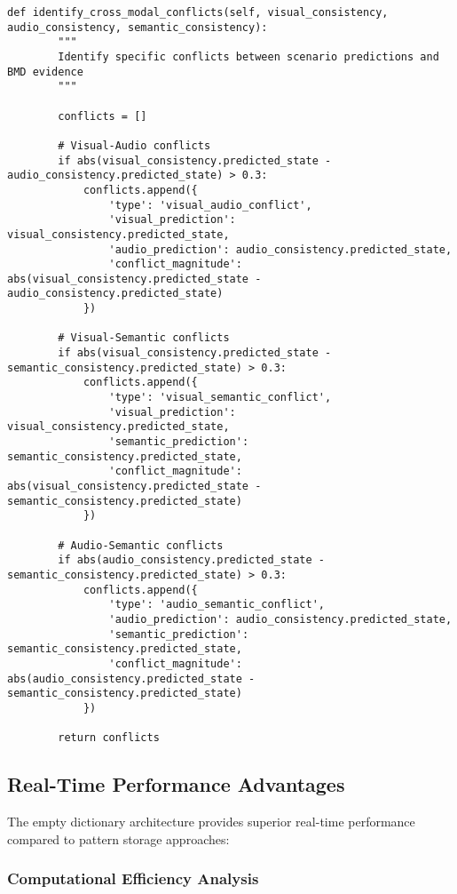 \documentclass[12pt,a4paper]{article}
\begin{document}
\begin{lstlisting}[style=pythonstyle, caption=Cross-Modal Scenario Consistency Validation]
    def identify_cross_modal_conflicts(self, visual_consistency, audio_consistency, semantic_consistency):
        """
        Identify specific conflicts between scenario predictions and BMD evidence
        """
        
        conflicts = []
        
        # Visual-Audio conflicts
        if abs(visual_consistency.predicted_state - audio_consistency.predicted_state) > 0.3:
            conflicts.append({
                'type': 'visual_audio_conflict',
                'visual_prediction': visual_consistency.predicted_state,
                'audio_prediction': audio_consistency.predicted_state,
                'conflict_magnitude': abs(visual_consistency.predicted_state - audio_consistency.predicted_state)
            })
        
        # Visual-Semantic conflicts
        if abs(visual_consistency.predicted_state - semantic_consistency.predicted_state) > 0.3:
            conflicts.append({
                'type': 'visual_semantic_conflict', 
                'visual_prediction': visual_consistency.predicted_state,
                'semantic_prediction': semantic_consistency.predicted_state,
                'conflict_magnitude': abs(visual_consistency.predicted_state - semantic_consistency.predicted_state)
            })
        
        # Audio-Semantic conflicts  
        if abs(audio_consistency.predicted_state - semantic_consistency.predicted_state) > 0.3:
            conflicts.append({
                'type': 'audio_semantic_conflict',
                'audio_prediction': audio_consistency.predicted_state, 
                'semantic_prediction': semantic_consistency.predicted_state,
                'conflict_magnitude': abs(audio_consistency.predicted_state - semantic_consistency.predicted_state)
            })
        
        return conflicts
\end{lstlisting}

\subsection{Real-Time Performance Advantages}

The empty dictionary architecture provides superior real-time performance compared to pattern storage approaches:

\subsubsection{Computational Efficiency Analysis}
\end{document}
